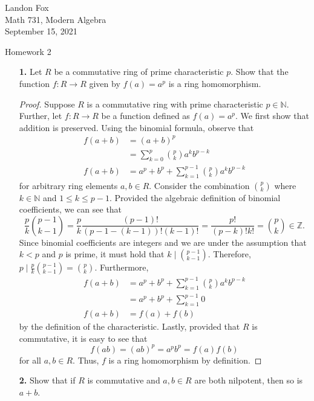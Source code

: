 \documentclass[ 12pt ]{article}
\begin{document}
\noindent Landon Fox \\
\noindent Math 731, Modern Algebra \\
\noindent September 15, 2021

\begin{center}
\Large Homework 2
\end{center}

\begin{enumerate}
	\item[\textbf{1.}] Let $R$ be a commutative ring of prime characteristic $p$. Show that the function $f : R \to R$ given by $f(a) = a^p$ is a ring homomorphism. 

		\begin{proof}
			Suppose $R$ is a commutative ring with prime characteristic $p \in \mathbb{N}$. Further, let $f : R \to R$ be a function defined as $f(a) = a^p$. We first show that addition is preserved. Using the binomial formula, observe that
			\begin{align*}
				f(a + b) &= (a + b)^p \\
				&= \sum_{k = 0}^p \binom{p}{k} a^k b^{p - k} \\
				f(a + b) &= a^p + b^p + \sum_{k = 1}^{p - 1} \binom{p}{k} a^k b^{p - k}
			\end{align*}
			for arbitrary ring elements $a, b \in R$. Consider the combination $\binom{p}{k}$ where $k \in \mathbb{N}$ and $1 \leq k \leq p - 1$. Provided the algebraic definition of binomial coefficients, we can see that $$\frac{p}{k} \binom{p-1}{k-1} = \frac{p}{k} \frac{(p-1)!}{(p-1-(k-1))! (k-1)!} = \frac{p!}{(p-k)!k!} = \binom{p}{k} \in \mathbb{Z}.$$ Since binomial coefficients are integers and we are under the assumption that $k < p$ and $p$ is prime, it must hold that $k \mid \binom{p - 1}{k - 1}$. Therefore, $p \mid \frac{p}{k} \binom{p - 1}{k - 1} = \binom{p}{k}$. Furthermore,
			\begin{align*}
				f(a + b) &= a^p + b^p + \sum_{k = 1}^{p - 1} \binom{p}{k} a^k b^{p - k} \\
				&= a^p + b^p + \sum_{k = 1}^{p - 1} 0 \\
				f(a + b) &= f(a) + f(b)
			\end{align*}
			by the definition of the characteristic. Lastly, provided that $R$ is commutative, it is easy to see that $$f(ab) = (ab)^p = a^p b^p = f(a) f(b)$$ for all $a, b \in R$. Thus, $f$ is a ring homomorphism by definition.
		\end{proof}


	\item[\textbf{2.}] Show that if $R$ is commutative and $a, b \in R$ are both nilpotent, then so is $a + b$.


\end{enumerate}
\end{document}
